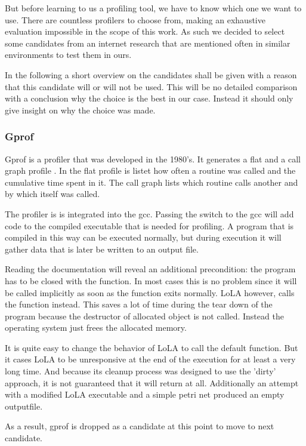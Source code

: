 But before learning to us a profiling tool, we have to know which one we want to use. There are countless profilers to choose from, making an exhaustive evaluation impossible in the scope of this work. As such we decided to select some candidates from an internet research that are mentioned often in similar environments to test them in ours.

In the following a short overview on the candidates shall be given with a reason that this candidate will or will not be used. This will be no detailed comparison with a conclusion why the choice is the best in our case. Instead it should only give insight on why the choice was made.

\subsubsection{Gprof}
Gprof is a profiler that was developed in the 1980's. It generates a flat and a call graph profile \cite{graham1982gprof}. In the flat profile is listet how often a routine was called and the cumulative time spent in it. The call graph lists which routine calls another and by which itself was called.

The profiler is is integrated into the gcc. Passing the  switch to the gcc will add code to the compiled executable that is needed for profiling. A program that is compiled in this way can be executed normally, but during execution it will gather data that is later be written to an output file.

Reading the documentation will reveal an additional precondition: the program has to be closed with the  function. In most cases this is no problem since it will be called implicitly as soon as the  function exits normally. LoLA however, calls the  function instead. This saves a lot of time during the tear down of the program because the destructor of allocated object is not called. Instead the operating system just frees the allocated memory.

It is quite easy to change the behavior of LoLA to call the default  function. But it cases LoLA to be unresponsive at the end of the execution for at least a very long time. And because its cleanup process was designed to use the 'dirty' approach, it is not guaranteed that it will return at all. Additionally an attempt with a modified LoLA executable and a simple petri net produced an empty outputfile.

As a result, gprof is dropped as a candidate at this point to move to next candidate.

